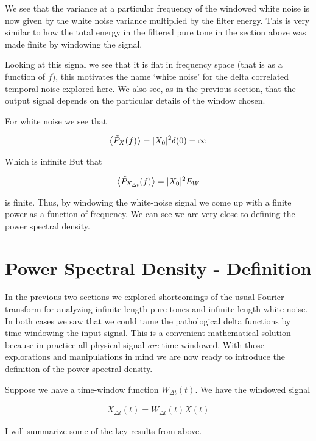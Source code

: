 \documentclass[12pt]{article}
\begin{document}
We see that the variance at a particular frequency of the windowed white noise is now given by the white noise variance multiplied by the filter energy.
This is very similar to how the total energy in the filtered pure tone in the section above was made finite by windowing the signal.


Looking at this signal we see that it is flat in frequency space (that is as a function of $f$), this motivates the name `white noise' for the delta correlated temporal noise explored here.
We also see, as in the previous section, that the output signal depends on the particular details of the window chosen.

For white noise we see that

\begin{align}
\Braket{\tilde{P}_X(f)} = |X_0|^2 \delta(0) = \infty
\end{align}

Which is infinite
But that

\begin{align}
\Braket{\tilde{P}_{X_{\Delta t}}(f)} = |X_0|^2 E_W
\end{align}

is finite.
Thus, by windowing the white-noise signal we come up with a finite power as a function of frequency.
We can see we are very close to defining the power spectral density.

\section{Power Spectral Density - Definition}

In the previous two sections we explored shortcomings of the usual Fourier transform for analyzing infinite length pure tones and infinite length white noise.
In both cases we saw that we could tame the pathological delta functions by time-windowing the input signal.
This is a convenient mathematical solution because in practice all physical signal \textit{are} time windowed.
With those explorations and manipulations in mind we are now ready to introduce the definition of the power spectral density.

Suppose we have a time-window function $W_{\Delta t}(t)$.
We have the windowed signal 

\begin{align}
X_{\Delta t}(t) = W_{\Delta t}(t) X(t)
\end{align}

I will summarize some of the key results from above.
\end{document}
